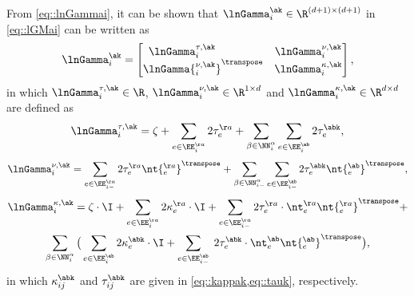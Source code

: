 From \cref{eq::lnGammai}, it can be shown that $\lnGamma_i^{\ak}\in\R^{(d+1)\times(d+1)}$ in \cref{eq::lGMai} can be written as
\begin{equation}\label{eq::lnGammaki}
\lnGamma_i^{\ak} = \begin{bmatrix}
\lnGamma_i^{\tau,\ak}\hphantom{{}^\transpose} & \lnGamma_i^{\nu,\ak}\\
\lnGamma{\vphantom{H}_i^{\nu,\ak}}^\transpose & \lnGamma_i^{\kappa,\ak}
\end{bmatrix},
\end{equation}
in which $\lnGamma_i^{\tau,\ak}\in\R$, $\lnGamma_i^{\nu,\ak}\in\R^{1\times d}$ and $\lnGamma_i^{\kappa,\ak}\in\R^{d\times d}$ are defined as
\begin{equation}\label{eq::lnGamma_ti}
\lnGamma_i^{\tau,\ak}=\zeta + \sum\limits_{e\in \EE_i^{\aa}}2\tau_{e}^{\aa}+\sum\limits_{\substack{\beta\in \NN_i^\alpha}}\sum\limits_{e\in \EE_i^{\ab}}2\tau_e^{\abk},
\end{equation}
\begin{equation}\label{eq::lnGamma_vi}
\lnGamma_i^{\nu,\ak}=\sum\limits_{e\in \EE_{i-}^{\aa}}2\tau_{e}^{\aa}\nt{_{e}^{\aa}}^\transpose+\sum\limits_{\substack{\beta\in \NN_{i-}^\alpha}}\sum\limits_{e\in \EE_{i-}^{\ab}}2\tau_e^{\abk}\nt{\vphantom{t}_{e}^{\ab}}^\transpose,
\end{equation}
\begin{multline}\label{eq::lnGamma_ri}
\lnGamma_i^{\kappa,\ak}=\zeta\cdot\I+\sum\limits_{e\in \EE_i^{\aa}}2\kappa_{e}^{\aa}\cdot\I+\sum\limits_{e\in \EE_{i-}^{\aa}}2\tau_{e}^{\aa}\cdot\nt_{e}^{\aa}\nt{\vphantom{t}_{e}^{\aa}}^\transpose+\\
\sum\limits_{\substack{\beta\in \NN_i^\alpha}}\big(\sum\limits_{e\in \EE_i^{\ab}}2\kappa_e^{\abk}\cdot\I+
\sum\limits_{e\in \EE_{i-}^{\ab}}\;2\tau_{e}^{\abk}\cdot\nt_{e}^{\ab}\nt{\vphantom{t}_{e}^{\ab}}^\transpose\big),
\end{multline}
in which $\kappa_{ij}^{\abk}$ and $\tau_{ij}^{\abk}$ are given in \cref{eq::kappak,eq::tauk}, respectively. 

